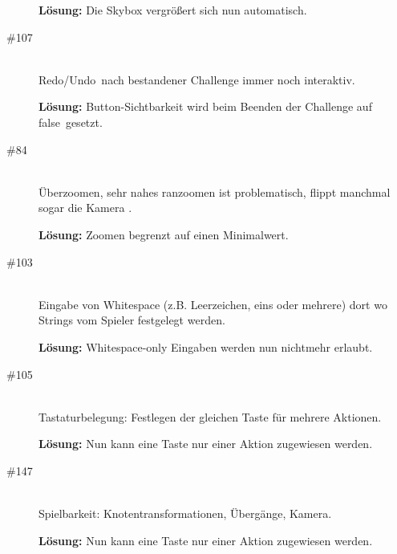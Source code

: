 \begin{description}
{\bfseries Lösung:} Die Skybox vergrößert sich nun automatisch.


\item[\#107] \hfill \\

\glqq Redo/Undo\grqq~nach bestandener Challenge immer noch interaktiv. 

{\bfseries Lösung:} Button-Sichtbarkeit wird beim Beenden der Challenge auf 
\glqq false\grqq~gesetzt.

\item[\#84] \hfill \\

\glqq Überzoomen\grqq, sehr nahes ranzoomen ist problematisch, flippt manchmal sogar die Kamera .

{\bfseries Lösung:} Zoomen begrenzt auf einen Minimalwert.


\item[\#103] \hfill \\
Eingabe von Whitespace (z.B. Leerzeichen, eins oder mehrere) dort wo Strings vom Spieler festgelegt werden. 

{\bfseries Lösung:} Whitespace-only Eingaben werden nun nichtmehr erlaubt.


\item[\#105] \hfill \\
Tastaturbelegung: Festlegen der gleichen Taste für mehrere Aktionen. 

{\bfseries Lösung:} Nun kann eine Taste nur einer Aktion zugewiesen werden.


\item[\#147] \hfill \\
Spielbarkeit: Knotentransformationen, Übergänge, Kamera. 

{\bfseries Lösung:} Nun kann eine Taste nur einer Aktion zugewiesen werden.


\end{description}

~\\


